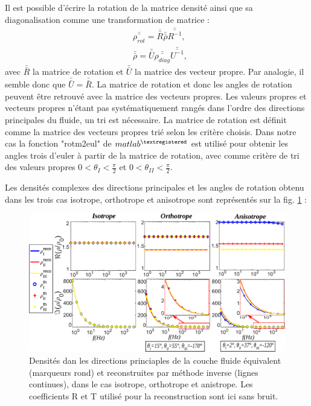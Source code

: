 \documentclass[twoside,openright]{report}
\begin{document}
    Il est possible d'écrire la rotation de la matrice densité ainsi que sa diagonalisation comme une transformation de matrice :
    \begin{align}
        &\bar{\bar{\rho_{rot}}}=\bar{\bar{R}}\bar{\bar{\rho}}\bar{\bar{R^{-1}}},\\
        &\bar{\bar{\rho}}=\bar{\bar{U}}\bar{\bar{\rho_{diag}}}\bar{\bar{U^{-1}}},
    \end{align}
    avec $\bar{\bar{R}}$ la matrice de rotation et $\bar{\bar{U}}$ la matrice des vecteur propre.
    Par analogie, il semble donc que $\bar{\bar{U}}=\bar{\bar{R}}$. La matrice de rotation et donc les angles de rotation peuvent être retrouvé avec la matrice des vecteurs propres. Les valeurs propres et vecteurs propres n'étant pas systématiquement rangés dans l'ordre des directions principales du fluide, un tri est nécessaire. La matrice de rotation est définit comme la matrice des vecteurs propres trié selon les critère choisis.  Dans notre cas la fonction "rotm2eul" de $matlab^{\textregistered}$ est utilisé pour obtenir les angles trois d'euler à partir de la matrice de rotation, avec comme critère de tri des valeurs propres $0<\theta_{I}<\frac{\pi}{2}$ et $0<\theta_{II}<\frac{\pi}{2}$.
    
    Les densités complexes des directions principales et les angles de rotation obtenu dans les trois cas isotrope, orthotrope et anisotrope sont représentés sur la fig. \ref{rho_dir} : 
    \begin{figure}[ht!]
        \centering
        \includegraphics[scale=0.45]{Density_dir.pdf}
        \caption{Densités dan les directions princiaples de la couche fluide équivalent (marqueurs rond) et reconstruites par méthode inverse  (lignes continues), dans le cas isotrope, orthotrope et anistrope. Les coefficients R et T utilisé pour la reconstruction sont ici sans bruit.}
        \label{rho_dir}
    \end{figure}
    
\end{document}
